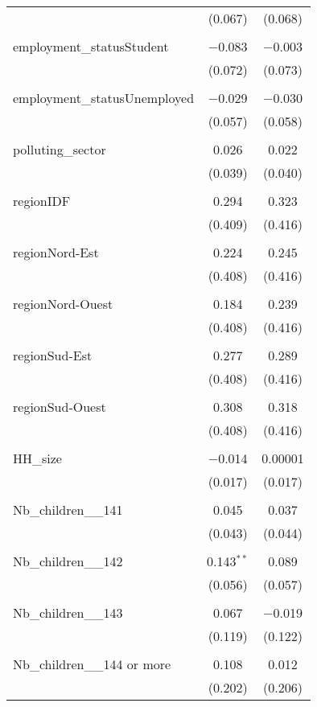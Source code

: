 \begin{tabular}{@{\extracolsep{5pt}}lcc}
  & (0.067) & (0.068) \\ 
  & & \\ 
 employment\_statusStudent & $-$0.083 & $-$0.003 \\ 
  & (0.072) & (0.073) \\ 
  & & \\ 
 employment\_statusUnemployed & $-$0.029 & $-$0.030 \\ 
  & (0.057) & (0.058) \\ 
  & & \\ 
 polluting\_sector & 0.026 & 0.022 \\ 
  & (0.039) & (0.040) \\ 
  & & \\ 
 regionIDF & 0.294 & 0.323 \\ 
  & (0.409) & (0.416) \\ 
  & & \\ 
 regionNord-Est & 0.224 & 0.245 \\ 
  & (0.408) & (0.416) \\ 
  & & \\ 
 regionNord-Ouest & 0.184 & 0.239 \\ 
  & (0.408) & (0.416) \\ 
  & & \\ 
 regionSud-Est & 0.277 & 0.289 \\ 
  & (0.408) & (0.416) \\ 
  & & \\ 
 regionSud-Ouest & 0.308 & 0.318 \\ 
  & (0.408) & (0.416) \\ 
  & & \\ 
 HH\_size & $-$0.014 & 0.00001 \\ 
  & (0.017) & (0.017) \\ 
  & & \\ 
 Nb\_children\_\_141 & 0.045 & 0.037 \\ 
  & (0.043) & (0.044) \\ 
  & & \\ 
 Nb\_children\_\_142 & 0.143$^{**}$ & 0.089 \\ 
  & (0.056) & (0.057) \\ 
  & & \\ 
 Nb\_children\_\_143 & 0.067 & $-$0.019 \\ 
  & (0.119) & (0.122) \\ 
  & & \\ 
 Nb\_children\_\_144 or more & 0.108 & 0.012 \\ 
  & (0.202) & (0.206) \\ 

\end{tabular}
